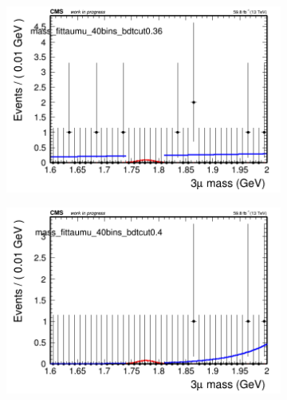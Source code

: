 \begin{figure}[H]
\begin{subfigure}{0.2\textwidth}
        \caption{}
    \end{subfigure}
    \begin{subfigure}{0.2\textwidth}
        \includegraphics[width=\textwidth]{power_law/plots/taumu/massfit_taumu_40bins_bdtcut0.36.png}
        \caption{}
    \end{subfigure}
    \begin{subfigure}{0.2\textwidth}
        \includegraphics[width=\textwidth]{power_law/plots/taumu/massfit_taumu_40bins_bdtcut0.4.png}
        \caption{}
    \end{subfigure}
    \begin{subfigure}{0.2\textwidth}

\end{subfigure}
\end{figure}
